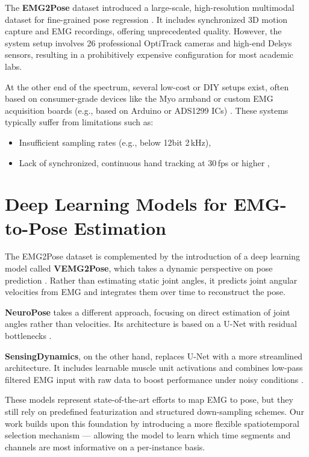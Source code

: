 The \textbf{EMG2Pose} dataset introduced a large-scale, high-resolution multimodal dataset for fine-grained pose regression \cite{salter2024emg2pose}. It includes synchronized 3D motion capture and EMG recordings, offering unprecedented quality. However, the system setup involves 26 professional OptiTrack cameras and high-end Delsys sensors, resulting in a prohibitively expensive configuration for most academic labs.

At the other end of the spectrum, several low-cost or DIY setups exist, often based on consumer-grade devices like the Myo armband or custom EMG acquisition boards (e.g., based on Arduino or ADS1299 ICs) \cite{nasri2020semg}. These systems typically suffer from limitations such as:
\begin{itemize}
    \item Insufficient sampling rates (e.g., below 12bit 2\,kHz),
    \item Lack of synchronized, continuous hand tracking at 30\,fps or higher \cite{graf2023combining},
\end{itemize}

\section{Deep Learning Models for EMG-to-Pose Estimation}

The EMG2Pose dataset is complemented by the introduction of a deep learning model called \textbf{VEMG2Pose}, which takes a dynamic perspective on pose prediction \cite{salter2024emg2pose}. Rather than estimating static joint angles, it predicts joint angular velocities from EMG and integrates them over time to reconstruct the pose.

\textbf{NeuroPose} takes a different approach, focusing on direct estimation of joint angles rather than velocities. Its architecture is based on a U-Net with residual bottlenecks \cite{lee2022explainable}.

\textbf{SensingDynamics}, on the other hand, replaces U-Net with a more streamlined architecture. It includes learnable muscle unit activations and combines low-pass filtered EMG input with raw data to boost performance under noisy conditions \cite{zanghieri2023semg}.

These models represent state-of-the-art efforts to map EMG to pose, but they still rely on predefined featurization and structured down-sampling schemes. Our work builds upon this foundation by introducing a more flexible spatiotemporal selection mechanism — allowing the model to learn which time segments and channels are most informative on a per-instance basis.

